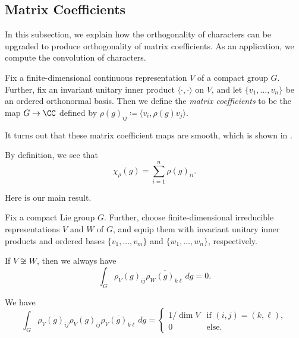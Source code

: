 \documentclass[notes.tex]{subfiles}
\begin{document}
\subsection{Matrix Coefficients}
In this subsection, we explain how the orthogonality of characters can be upgraded to produce orthogonality of matrix coefficients. As an application, we compute the convolution of characters.
\begin{definition}
	Fix a finite-dimensional continuous representation $V$ of a compact group $G$. Further, fix an invariant unitary inner product $\langle\cdot,\cdot\rangle$ on $V$, and let $\{v_1,\ldots,v_n\}$ be an ordered orthonormal basis. Then we define the \textit{matrix coefficients} to be the map $G\to\CC$ defined by $\rho(g)_{ij}\coloneqq\langle v_i,\rho(g)v_j\rangle$.
\end{definition}
It turns out that these matrix coefficient maps are smooth, which is shown in .
\begin{example}
	By definition, we see that
	\[\chi_\rho(g)=\sum_{i=1}^n\rho(g)_{ii}.\]
\end{example}
Here is our main result.
\begin{proposition} \label{prop:matrix-coef-ortho}
	Fix a compact Lie group $G$. Further, choose finite-dimensional irreducible representations $V$ and $W$ of $G$, and equip them with invariant unitary inner products and ordered bases $\{v_1,\ldots,v_m\}$ and $\{w_1,\ldots,w_n\}$, respectively.
	\begin{listalph}
		\item If $V\not\cong W$, then we always have
		\[\int_G\rho_V(g)_{ij}\overline{\rho_W(g)_{k\ell}}\,dg=0.\]
		\item We have
		\[\int_G\rho_V(g)_{ij}\rho_V(g)_{ij}\overline{\rho_V(g)_{k\ell}}\,dg=\begin{cases}
			1/\dim V & \text{if }(i,j)=(k,\ell), \\
			0 & \text{else}.
		\end{cases}\]
	\end{listalph}
\end{proposition}
\end{document}
